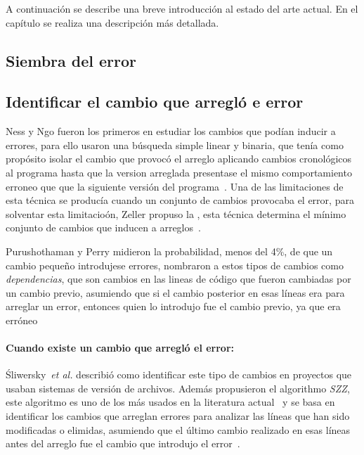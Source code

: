 \documentclass[a4paper, 12pt]{book}
\begin{document}
A continuaci\'on se describe una breve introducci\'on al estado del arte actual. En el cap\'itulo  se realiza una descripci\'on m\'as detallada.
\subsection{Siembra del error}
\label{subsec:siembra}

\subsection{Identificar el cambio que arregl\'o e error}
Ness y Ngo fueron los primeros en estudiar los cambios que pod\'ian inducir a errores, para ello usaron una b\'usqueda simple linear y binaria, que ten\'ia como prop\'osito isolar el cambio que provoc\'o el arreglo aplicando cambios cronol\'ogicos al programa hasta que la version arreglada presentase el mismo comportamiento erroneo que que la siguiente versi\'on del programa~\cite{ness1997regression}. Una de las limitaciones de esta t\'ecnica se produc\'ia cuando un conjunto de cambios provocaba el error, para solventar esta limitacio\'on, Zeller propuso la , esta t\'ecnica determina el m\'inimo conjunto de cambios que inducen a arreglos~\cite{zeller1999yesterday}.

Purushothaman y Perry midieron la probabilidad, menos del 4\%, de que un cambio peque\~no introdujese errores, nombraron a estos tipos de cambios como \emph{dependencias}, que son cambios en las lineas de c\'odigo que fueron cambiadas por un cambio previo, asumiendo que si el cambio posterior en esas l\'ineas era para arreglar un error, entonces quien lo introdujo fue el cambio previo, ya que era err\'oneo~\cite{purushothaman2004towards}

\paragraph{Cuando existe un cambio que arregl\'o el error:}
\'Sliwersky~\emph{et al.} describi\'o como identificar este tipo de cambios en proyectos que usaban sistemas de versi\'on de archivos. Adem\'as propusieron el algorithmo \emph{SZZ}, este algoritmo es uno de los m\'as usados en la literatura actual~ y se basa en identificar los cambios que arreglan errores para analizar las l\'ineas que han sido modificadas o elimidas, asumiendo que el \'ultimo cambio realizado en esas l\'ineas antes del arreglo fue el cambio que introdujo el error~\cite{sliwerski2005changes}.
\end{document}
